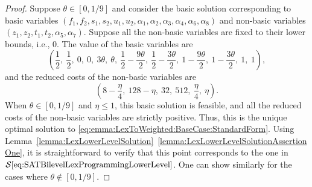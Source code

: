 \documentclass[runningheads,orivec]{llncs}
\newcommand{\MacroColor}[1]{#1}
\newcommand{\OptSolSet}{\MacroColor{\mathcal{S}}}
\newcommand{\ReformZ}{\MacroColor{z}}
\newcommand{\ReformAugFrac}{\MacroColor{f}}
\newcommand{\LexUVar}{\MacroColor{\theta}}
\newcommand{\LexLVarS}{\MacroColor{s}}
\newcommand{\LexLVarT}{\MacroColor{t}}
\newcommand{\LexLVarU}{\MacroColor{u}}
\begin{document}
\begin{appendix}
\begin{proof}
Suppose $\LexUVar \in [0, 1/9]$ and consider the basic solution corresponding to basic variables $(\ReformAugFrac_1, \ReformAugFrac_2, \LexLVarS_1, \LexLVarS_2, \LexLVarU_1, \LexLVarU_2, \alpha_1, \alpha_2, \alpha_3, \alpha_4, \alpha_6, \alpha_8)$ and non-basic variables $(\ReformZ_1, \ReformZ_2, \LexLVarT_1, \LexLVarT_2, \alpha_5, \alpha_7)$.
Suppose all the non-basic variables are fixed to their lower bounds, i.e., $0$.
The value of the basic variables are
$$
\left( \frac{1}{2}, \  \frac{1}{2}, \  0, \  0, \  3 \theta, \  \theta, \  \frac{1}{2} - \frac{9 \theta}{2}, \  \frac{1}{2} - \frac{3 \theta}{2}, \  1 - \frac{9 \theta}{2}, \  1 - \frac{3 \theta}{2}, \  1, \  1\right),
$$
and the reduced costs of the non-basic variables are
$$
\left( 
8 - \frac{\eta}{4}, \  128 - \eta, \  32, \  512, \  \frac{\eta}{4}, \  \eta
\right).
$$
When $\LexUVar \in [0, 1/9]$ and $\eta \le 1$, this basic solution is feasible, and all the reduced costs of the non-basic variables are strictly positive.
Thus, this is the unique optimal solution to \eqref{eq:emma:LexToWeighted:BaseCase:StandardForm}.
Using Lemma~\ref{lemma:LexLowerLevelSolution}~\ref{lemma:LexLowerLevelSolutionAssertionOne}, it is straightforward to verify that this point corresponds to the one in $\OptSolSet\eqref{eq:SATBilevelLexProgrammingLowerLevel}$.
One can show similarly for the cases where $\LexUVar \not\in [0, 1/9]$.


\end{proof}
\end{appendix}
\end{document}
